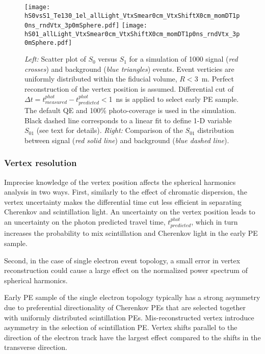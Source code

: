\begin{figure*}[h]
  \centering
  \texttt{[image: hS0vsS1\_Te130\_1el\_allLight\_VtxSmear0cm\_VtxShiftX0cm\_momDT1p0ns\_rndVtx\_3p0mSphere.pdf]}
  \texttt{[image: hS01\_allLight\_VtxSmear0cm\_VtxShiftX0cm\_momDT1p0ns\_rndVtx\_3p0mSphere.pdf]}
  \caption{\emph{Left:} Scatter plot of $S_0$ versus $S_1$ for a simulation of 1000 signal (\emph{red crosses}) and background
    (\emph{blue triangles}) events. Event verticies are uniformly distributed within the fiducial volume, $R<3$~m.
    Perfect reconstruction of the vertex position is assumed. Differential cut of 
    $\Delta t=t^{phot}_{measured} - t^{phot}_{predicted}<$1~ns is applied to select early PE sample.
    The default QE and 100\% photo-coverage is used in the simulation.
    Black dashed line corresponds to a linear fit to define 1-D variable $S_{01}$ (see text for details).
    \emph{Right:} Comparison of the $S_{01}$ distribution between signal (\emph{red solid line}) and background (\emph{blue dashed line}).}
  \label{fig:SL_Te_SmearX0cm_momDT1ns_rndVtx_3p0m}
\end{figure*}


\subsubsection{Vertex resolution} 
Imprecise knowledge of the vertex position affects the spherical harmonics analysis in two ways. First, similarly to the effect of chromatic 
dispersion, the vertex uncertainty makes the differential time cut less efficient in separating Cherenkov and scintillation light. 
An uncertainty on the vertex position leads to an uncertainty on the photon predicted travel time, $t^{phot}_{predicted}$, which in turn
increases the probability to mix scintillation and Cherenkov light in the early PE sample.

Second, in the case of single electron event topology, a small error in vertex reconstruction could cause a large effect on the 
normalized power spectrum of spherical harmonics.

Early PE sample of the single electron topology typically has a strong asymmetry due
to preferential directionality of Cherenkov PEs that are selected together with uniformly distributed scintillation PEs. 
Mis-reconstructed vertex introduce asymmetry in the selection of scintillation PE. Vertex shifts parallel to the direction of 
the electron track have the largest effect compared to the shifts in the transverse direction. 

